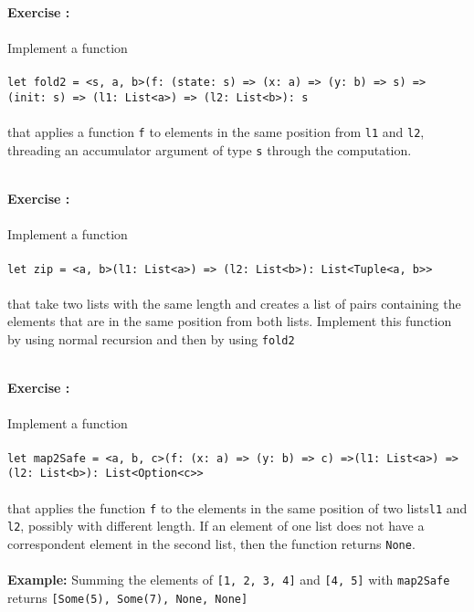 \documentclass[]{article}
\newcounter{ExerciseCount}
\newcommand{\functionEx}[3]{
  Implement a function\\\\
   \texttt{let #1 = #2}\\\\ #3
}
\newcommand{\exercise}[1]{\noindent \textbf{Exercise \theExerciseCount:}\\\\ #1 \addtocounter{ExerciseCount}{1}
}
\begin{document}
\exercise{
  \functionEx{fold2}{<s, a, b>(f: (state: s) => (x: a) => (y: b) => s) => (init: s) => (l1: List<a>) => (l2: List<b>): s}{
    that applies a function \texttt{f} to elements in the same position from \texttt{l1} and \texttt{l2}, threading an accumulator argument of type \texttt{s} through the computation.
}}\\

\exercise{
  \functionEx{zip}{<a, b>(l1: List<a>) => (l2: List<b>): List<Tuple<a, b>>}{
    that take two lists with the same length and creates a list of pairs containing the elements that are in the same position from both lists. Implement this function by using normal recursion and then by using \texttt{fold2}
}}\\

\exercise{
  \functionEx{map2Safe}{<a, b, c>(f: (x: a) => (y: b) => c) =>(l1: List<a>) =>\\ (l2: List<b>): List<Option<c>>}{
    that applies the function \texttt{f} to the elements in the same position of two lists\texttt{l1} and \texttt{l2}, possibly with different length. If an element of one list does not have a correspondent element in the second list, then the function returns \texttt{None}.\\\\
    
    \noindent
    \textbf{Example:}
    Summing the elements of \texttt{[1, 2, 3, 4]} and \texttt{[4, 5]} with \texttt{map2Safe} returns \texttt{[Some(5), Some(7), None, None]}
}}\\
\end{document}
